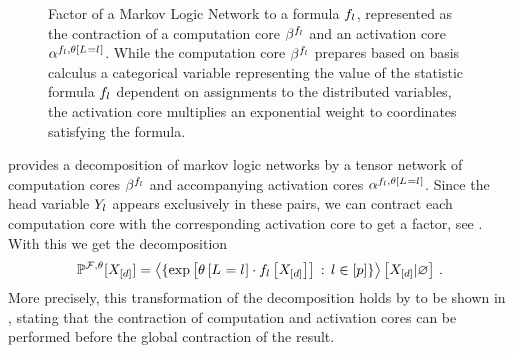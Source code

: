 \begin{figure}[t!]
    \begin{center}
        
    \end{center}
    \caption{Factor of a Markov Logic Network to a formula $f_{l}$, represented as the contraction of a computation core $\beta^{f_{l}}$ and an activation core $\alpha^{f_{l},\theta\left[L_{}=l_{}\right]}$.
    While the computation core $\beta^{f_{l}}$ prepares based on basis calculus a categorical variable representing the value of the statistic formula $f_{l}$ dependent on assignments to the distributed variables, the activation core multiplies an exponential weight to coordinates satisfying the formula.
    }
    \label{fig:mlnFactor}
\end{figure}

 provides a decomposition of markov logic networks by a tensor network of computation cores $\beta^{f_{l}}$ and accompanying activation cores $\alpha^{f_{l},\theta\left[L_{}=l_{}\right]}$.
Since the head variable $Y_{l}$ appears exclusively in these pairs, we can contract each computation core with the corresponding activation core to get a factor, see .
With this we get the decomposition
\begin{align*}
    \mathbb{P}^{\mathcal{F},\theta}[X_{[d]}]
    = \left\langle \{\mathrm{exp}\left[\theta\left[L_{}=l_{}\right]\cdot f_{l}\left[X_{[d]}\right]\right] \, : \, l\in[p]\}\right\rangle \left[ X_{[d]} | \varnothing \right] \, .
\end{align*}
More precisely, this transformation of the decomposition holds by  to be shown in , stating that the contraction of computation and activation cores can be performed before the global contraction of the result.

